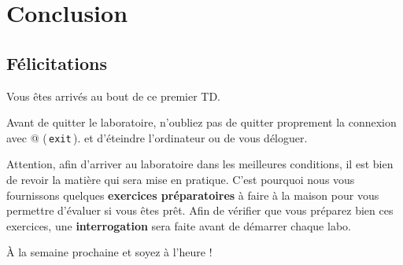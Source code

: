\documentclass[11pt,a4paper]{article}
\begin{document}
				\section{Conclusion}\subsection{F\'elicitations}
					Vous \^etes arriv\'es au bout de ce premier TD.
        				
            \par
        
					Avant de quitter le laboratoire, n'oubliez pas de 
					quitter proprement la connexion avec @
						(\,\verb|exit|\,).
					et d'\'eteindre l'ordinateur ou de vous d\'eloguer.
					
            \par
        
					Attention, afin d'arriver au laboratoire dans les meilleures conditions, il est 
					bien de revoir la mati\`ere qui sera mise en pratique.
					C'est pourquoi nous vous fournissons quelques \textbf{exercices pr\'eparatoires} \`a faire \`a la maison 
					pour vous permettre d'\'evaluer si vous \^etes pr\^et.
					Afin de v\'erifier que vous pr\'eparez bien ces exercices, une
					\textbf{interrogation}
					sera faite avant de d\'emarrer chaque labo.
				
            \par
        
					\`A la semaine prochaine et soyez \`a l'heure !
				
            \par
        
				
\end{document}

